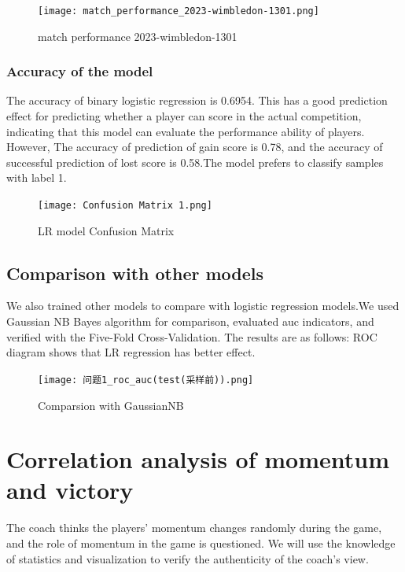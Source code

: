 \documentclass{mcmthesis}  %
\begin{document}
\begin{figure}[!htb]  %
\small
\centering  %
\texttt{[image: match\_performance\_2023-wimbledon-1301.png]}  %
\caption{match performance 2023-wimbledon-1301} \label{fig:match_performance_2023-wimbledon-1301}  %
\end{figure}  %

\subsubsection{Accuracy of the model}
\hspace{1.5em}The accuracy of binary logistic regression is 0.6954. This has a good prediction effect for predicting whether a player can score in the actual competition, indicating that this model can evaluate the performance ability of players. However, The accuracy of prediction of gain score is 0.78, and the accuracy of successful prediction of lost score is 0.58.The model prefers to classify samples with label 1.
\begin{figure}[!htb]  %
\small
\centering  %
\texttt{[image: Confusion Matrix 1.png]}  %
\caption{LR model Confusion Matrix} \label{fig:Confusion Matrix 1.png}  %
\end{figure}  %



\subsection{Comparison with other models}
\hspace{1.5em}We also trained other models to compare with logistic regression models.We used Gaussian NB Bayes algorithm for comparison, evaluated auc indicators, and verified with the Five-Fold Cross-Validation. The results are as follows:
ROC diagram shows that LR regression has better effect.

\begin{figure}[!htb]  %
\small
\centering  %
\texttt{[image: 问题1\_roc\_auc(test(采样前)).png]}  %
\caption{Comparsion with GaussianNB} \label{fig:Comparsion with GaussianNB}  %
\end{figure}  %

\section{Correlation analysis of momentum and victory}
\hspace{1.5em}The coach thinks the players' momentum changes randomly during the game, and the role of momentum in the game is questioned. We will use the knowledge of statistics and visualization to verify the authenticity of the coach's view.
\end{document}
